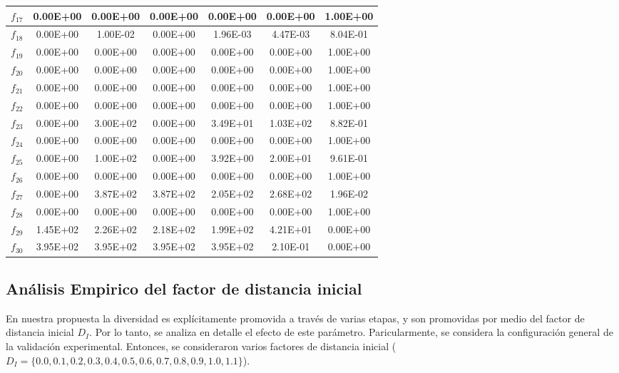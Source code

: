 \begin{table}[t]
\begin{scriptsize}
\begin{tabular}{|c|c|c|c|c|c|c|}
$f_{17}$ & 0.00E+00 & 0.00E+00 & 0.00E+00 & 0.00E+00 & 0.00E+00 & 1.00E+00 \\ \hline
$f_{18}$ & 0.00E+00 & 1.00E-02 & 0.00E+00 & 1.96E-03 & 4.47E-03 & 8.04E-01 \\ \hline
$f_{19}$ & 0.00E+00 & 0.00E+00 & 0.00E+00 & 0.00E+00 & 0.00E+00 & 1.00E+00 \\ \hline
$f_{20}$ & 0.00E+00 & 0.00E+00 & 0.00E+00 & 0.00E+00 & 0.00E+00 & 1.00E+00 \\ \hline
$f_{21}$ & 0.00E+00 & 0.00E+00 & 0.00E+00 & 0.00E+00 & 0.00E+00 & 1.00E+00 \\ \hline
$f_{22}$ & 0.00E+00 & 0.00E+00 & 0.00E+00 & 0.00E+00 & 0.00E+00 & 1.00E+00 \\ \hline
$f_{23}$ & 0.00E+00 & 3.00E+02 & 0.00E+00 & 3.49E+01 & 1.03E+02 & 8.82E-01 \\ \hline
$f_{24}$ & 0.00E+00 & 0.00E+00 & 0.00E+00 & 0.00E+00 & 0.00E+00 & 1.00E+00 \\ \hline
$f_{25}$ & 0.00E+00 & 1.00E+02 & 0.00E+00 & 3.92E+00 & 2.00E+01 & 9.61E-01 \\ \hline
$f_{26}$ & 0.00E+00 & 0.00E+00 & 0.00E+00 & 0.00E+00 & 0.00E+00 & 1.00E+00 \\ \hline
$f_{27}$ & 0.00E+00 & 3.87E+02 & 3.87E+02 & 2.05E+02 & 2.68E+02 & 1.96E-02 \\ \hline
$f_{28}$ & 0.00E+00 & 0.00E+00 & 0.00E+00 & 0.00E+00 & 0.00E+00 & 1.00E+00 \\ \hline
$f_{29}$ & 1.45E+02 & 2.26E+02 & 2.18E+02 & 1.99E+02 & 4.21E+01 & 0.00E+00 \\ \hline
$f_{30}$ & 3.95E+02 & 3.95E+02 & 3.95E+02 & 3.95E+02 & 2.10E-01 & 0.00E+00 \\ \hline
\end{tabular}%
\end{scriptsize}
\end{table}

\subsection{Análisis Empirico del factor de distancia inicial}

En nuestra propuesta la diversidad es explícitamente promovida a través de varias etapas, y son promovidas por medio del factor de distancia inicial $D_I$.
%
Por lo tanto, se analiza en detalle el efecto de este parámetro.
%
Paricularmente, se considera la configuración general de la validación experimental.
%
Entonces, se consideraron varios factores de distancia inicial ($D_I = \{0.0, 0.1, 0.2, 0.3, 0.4, 0.5, 0.6, 0.7, 0.8, 0.9, 1.0, 1.1 \}$).

